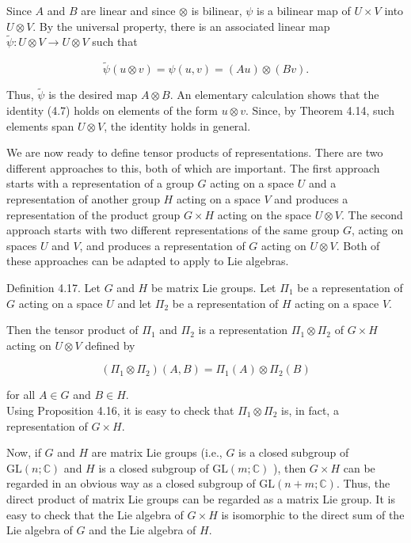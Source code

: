 \documentclass[10pt, letterpaper]{article}
\begin{document}
Since $A$ and $B$ are linear and since $\otimes$ is bilinear, $\psi$ is a bilinear map of $U \times V$ into $U \otimes V$. By the universal property, there is an associated linear map $\tilde{\psi}: U \otimes V \rightarrow U \otimes V$ such that

$$
\tilde{\psi}(u \otimes v)=\psi(u, v)=(A u) \otimes(B v) .
$$

Thus, $\tilde{\psi}$ is the desired map $A \otimes B$. An elementary calculation shows that the identity (4.7) holds on elements of the form $u \otimes v$. Since, by Theorem 4.14, such elements span $U \otimes V$, the identity holds in general.

We are now ready to define tensor products of representations. There are two different approaches to this, both of which are important. The first approach starts with a representation of a group $G$ acting on a space $U$ and a representation of another group $H$ acting on a space $V$ and produces a representation of the product group $G \times H$ acting on the space $U \otimes V$. The second approach starts with two different representations of the same group $G$, acting on spaces $U$ and $V$, and produces a representation of $G$ acting on $U \otimes V$. Both of these approaches can be adapted to apply to Lie algebras.

Definition 4.17. Let $G$ and $H$ be matrix Lie groups. Let $\Pi_{1}$ be a representation of $G$ acting on a space $U$ and let $\Pi_{2}$ be a representation of $H$ acting on a space $V$.

Then the tensor product of $\Pi_{1}$ and $\Pi_{2}$ is a representation $\Pi_{1} \otimes \Pi_{2}$ of $G \times H$ acting on $U \otimes V$ defined by

$$
\left(\Pi_{1} \otimes \Pi_{2}\right)(A, B)=\Pi_{1}(A) \otimes \Pi_{2}(B)
$$

for all $A \in G$ and $B \in H$.\\
Using Proposition 4.16, it is easy to check that $\Pi_{1} \otimes \Pi_{2}$ is, in fact, a representation of $G \times H$.

Now, if $G$ and $H$ are matrix Lie groups (i.e., $G$ is a closed subgroup of $\mathrm{GL}(n ; \mathbb{C})$ and $H$ is a closed subgroup of $\mathrm{GL}(m ; \mathbb{C})$ ), then $G \times H$ can be regarded in an obvious way as a closed subgroup of $\mathrm{GL}(n+m ; \mathbb{C})$. Thus, the direct product of matrix Lie groups can be regarded as a matrix Lie group. It is easy to check that the Lie algebra of $G \times H$ is isomorphic to the direct sum of the Lie algebra of $G$ and the Lie algebra of $H$.
\end{document}
